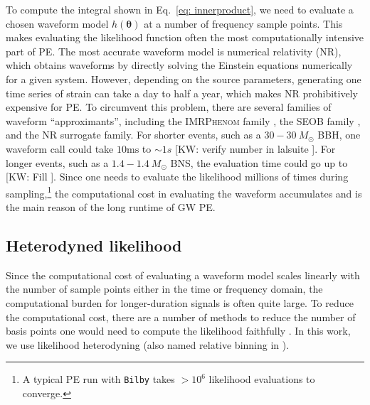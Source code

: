 \documentclass[twocolumn]{aastex631}
\newcommand{\kw}[1]{{\color{rb4}[KW: #1 ]}}
\begin{document}
To compute
the integral shown in Eq.~\eqref{eq: innerproduct}, we need to evaluate a chosen
waveform model $h(\mathbf{\theta})$ at a number of frequency sample points.
This makes evaluating the likelihood function often the most computationally intensive
part of PE. The most accurate waveform model is numerical relativity (NR),
which obtains waveforms by directly solving the Einstein equations numerically
for a given system.
However, depending on the source parameters, generating one time series of
strain can take a day to half a year, which makes NR prohibitively expensive for
PE. To circumvent this problem, there are several families of waveform ``approximants'', including the \textsc{IMRPhenom} family \cite{Khan:2015jqa,
Garcia-Quiros:2020qpx}, the \textsc{SEOB} family \cite{PhysRevD.89.061502}, and the NR surrogate
family\cite{Varma:2019csw}. For shorter events, such as a $30-30\ M_{\odot}$ BBH, one
waveform call could take $10\text{ms}$ to ${\sim}1s$ \kw{verify number in
lalsuite}. For longer events, such as a $1.4-1.4\ M_{\odot}$ BNS, the
evaluation time could go up to \kw{Fill}. Since one needs to evaluate the
likelihood millions of times during sampling,\footnote{A typical PE run with
\texttt{Bilby} takes ${>}10^6$ likelihood evaluations to converge.} the
computational cost in evaluating the waveform accumulates and is the main reason
of the long runtime of GW PE.

\subsection{Heterodyned likelihood}

Since the computational cost of evaluating a waveform model scales linearly
with the number of sample points either in the time or frequency domain, the
computational burden for longer-duration signals is often quite large. To
reduce the computational cost, there are a number of methods to reduce the
number of basis points one would need to compute the likelihood faithfully
\cite{Field:2011mf, Field:2013cfa, Smith:2016qas, Vinciguerra:2017ngf}. In this
work, we use likelihood heterodyning \cite{Cornish:2021lje} (also named
relative binning in \cite{Zackay:2018qdy}).
\end{document}
